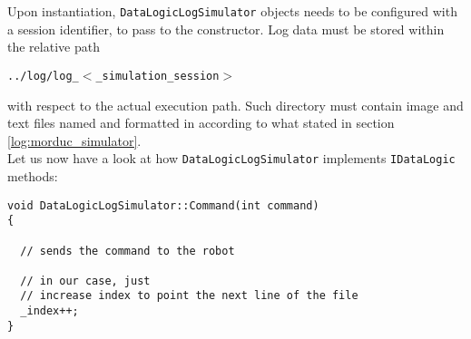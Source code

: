 Upon instantiation, \texttt{DataLogicLogSimulator} objects needs to be 
configured with a session identifier, to pass to 
the constructor. Log data must be stored within the relative path 

\begin{center}
  \texttt{../log/log\_$<$\_simulation\_session$>$}
\end{center}

with respect to the actual execution path.
Such directory must contain image and text files named and formatted
in according to what stated in section \ref{log:morduc_simulator}. 
\\
Let us now have a look at how \texttt{DataLogicLogSimulator} implements 
\texttt{IDataLogic} methods:
\\
\begin{lstlisting}[caption={\texttt{DataLogicLogSimulator::Command() method}},
    label={code:datalogiclogsimulator:command}]
void DataLogicLogSimulator::Command(int command) 
{

  // sends the command to the robot

  // in our case, just 
  // increase index to point the next line of the file
  _index++;
}
\end{lstlisting}

